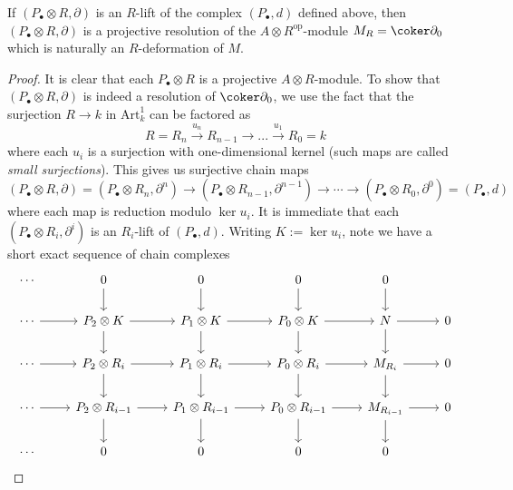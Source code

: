 \begin{lemma}
    If \((P_\bullet\otimes R, \partial)\) is an \(R\)-lift of the
    complex \((P_\bullet, d)\) defined above, then \((P_\bullet\otimes
    R, \partial)\) is a projective resolution of the \(A\otimes
    R^{\text{op}}\)-module \(M_R=\coker\partial_0\) which is naturally an
    \(R\)-deformation of \(M\).

    \begin{proof}
        It is clear that each \(P_\bullet\otimes R\) is a projective \(A\otimes
        R\)-module. To show that \((P_\bullet\otimes R, \partial)\) is
        indeed a resolution of \(\coker\partial_0\), we use the fact that the
        surjection \(R\rightarrow k\) in \(\text{Art}^1_k\) can be factored
        as 
        \[R=R_n\xrightarrow{u_n}R_{n-1}\rightarrow ...
        \xrightarrow{u_1}R_0=k\] 
        where each \(u_i\) is a surjection with
        one-dimensional kernel (such maps are called \textit{small
        surjections}). This gives us surjective chain maps
        \[(P_\bullet\otimes R,\partial) = (P_\bullet\otimes
            R_n,\partial^n)\rightarrow (P_\bullet\otimes
            R_{n-1},\partial^{n-1}) \rightarrow \cdots \rightarrow
            (P_\bullet\otimes R_0,\partial^0)=(P_\bullet, d)\]
        where each map is reduction modulo \(\ker u_i\). It is immediate that
        each \((P_\bullet\otimes R_i,\partial^i)\) is an \(R_i\)-lift of
        \((P_\bullet, d)\). Writing \(K:=\ker u_i\), note we have a
        short exact sequence of chain complexes 
        \[\begin{tikzcd} 
            \cdots  & 0\arrow[d] & 0\arrow[d] & 0\arrow[d] & 0\arrow[d] & \\
            \cdots \arrow[r] & P_2\otimes K \arrow[r]\arrow[d] &
            P_1\otimes K\arrow[r]\arrow[d] &
            P_0\otimes K\arrow[r]\arrow[d] & N\arrow[r]\arrow[d] & 0 \\ 
            \cdots \arrow[r] & P_2\otimes R_i \arrow[r] \arrow[d] & P_1\otimes
            R_i \arrow[r]\arrow[d] & P_0\otimes R_i \arrow[r]\arrow[d] & M_{R_i}
            \arrow[r]\arrow[d] & 0 \\
            \cdots \arrow[r] & P_2 \otimes R_{i-1} \arrow[r]\arrow[d] &
            P_1\otimes R_{i-1}\arrow[r]\arrow[d] &
            P_0\otimes R_{i-1}\arrow[r]\arrow[d] & M_{R_{i-1}}\arrow[r]\arrow[d]
                                                 & 0 \\ 
            \cdots  & 0 & 0 & 0 & 0 & 
        \end{tikzcd}\]

\end{proof}
\end{lemma}
